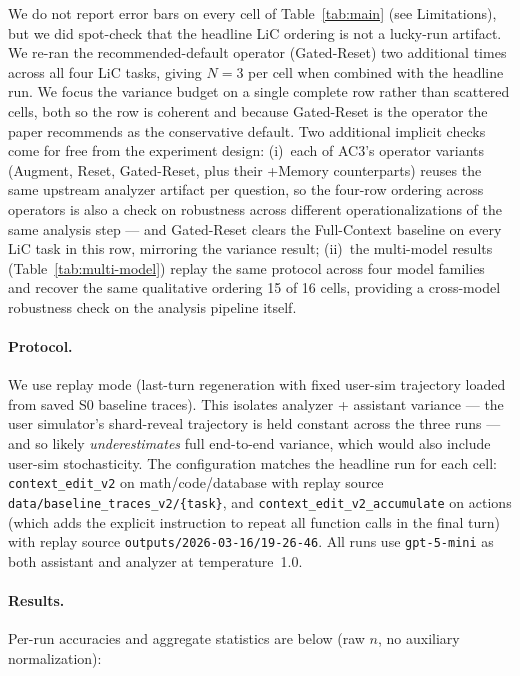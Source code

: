 \documentclass{article}
\newcommand{\method}{AC3\xspace}
\begin{document}
We do not report error bars on every cell of Table~\ref{tab:main} (see Limitations), but we did spot-check that the headline LiC ordering is not a lucky-run artifact. We re-ran the recommended-default operator (Gated-Reset) two additional times across all four LiC tasks, giving $N{=}3$ per cell when combined with the headline run. We focus the variance budget on a single complete row rather than scattered cells, both so the row is coherent and because Gated-Reset is the operator the paper recommends as the conservative default. Two additional implicit checks come for free from the experiment design: (i)~each of \method's operator variants (Augment, Reset, Gated-Reset, plus their +Memory counterparts) reuses the same upstream analyzer artifact per question, so the four-row ordering across operators is also a check on robustness across different operationalizations of the same analysis step --- and Gated-Reset clears the Full-Context baseline on every LiC task in this row, mirroring the variance result; (ii)~the multi-model results (Table~\ref{tab:multi-model}) replay the same protocol across four model families and recover the same qualitative ordering 15 of 16 cells, providing a cross-model robustness check on the analysis pipeline itself.

\paragraph{Protocol.} We use replay mode (last-turn regeneration with fixed user-sim trajectory loaded from saved S0 baseline traces). This isolates analyzer + assistant variance --- the user simulator's shard-reveal trajectory is held constant across the three runs --- and so likely \emph{underestimates} full end-to-end variance, which would also include user-sim stochasticity. The configuration matches the headline run for each cell: \texttt{context\_edit\_v2} on math/code/database with replay source \texttt{data/baseline\_traces\_v2/\{task\}}, and \texttt{context\_edit\_v2\_accumulate} on actions (which adds the explicit instruction to repeat all function calls in the final turn) with replay source \texttt{outputs/2026-03-16/19-26-46}. All runs use \texttt{gpt-5-mini} as both assistant and analyzer at temperature~1.0.

\paragraph{Results.} Per-run accuracies and aggregate statistics are below (raw $n$, no auxiliary normalization):
\end{document}
